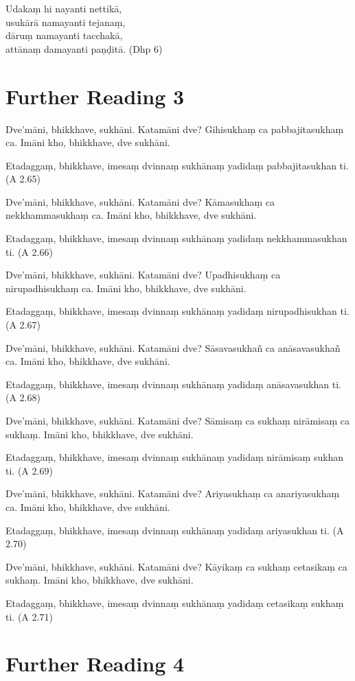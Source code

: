 Udakaṃ hi nayanti nettikā,\\
usukārā namayanti tejanaṃ,\\
dāruṃ namayanti tacchakā,\\
attānaṃ damayanti paṇḍitā. \hfill(Dhp 6)

\section*{Further Reading 3}

Dve’māni, bhikkhave, sukhāni. Katamāni dve? Gihisukhaṃ ca pabbajitasukhaṃ ca. Imāni kho, bhikkhave, dve sukhāni.

Etadaggaṃ, bhikkhave, imesaṃ dvinnaṃ sukhānaṃ yadidaṃ pabbajitasukhan ti. \hfill(A 2.65)

Dve’māni, bhikkhave, sukhāni. Katamāni dve? Kāmasukhaṃ ca nekkhammasukhaṃ ca. Imāni kho, bhikkhave, dve sukhāni.

Etadaggaṃ, bhikkhave, imesaṃ dvinnaṃ sukhānaṃ yadidaṃ nekkhammasukhan ti. \hfill(A 2.66)

Dve’māni, bhikkhave, sukhāni. Katamāni dve? Upadhisukhaṃ ca nirupadhisukhaṃ ca. Imāni kho, bhikkhave, dve sukhāni.

Etadaggaṃ, bhikkhave, imesaṃ dvinnaṃ sukhānaṃ yadidaṃ nirupadhisukhan ti. \hfill(A 2.67)

Dve’māni, bhikkhave, sukhāni. Katamāni dve? Sāsavasukhañ ca anāsavasukhañ ca. Imāni kho, bhikkhave, dve sukhāni.

Etadaggaṃ, bhikkhave, imesaṃ dvinnaṃ sukhānaṃ yadidaṃ anāsavasukhan ti. \hfill(A 2.68)

Dve’māni, bhikkhave, sukhāni. Katamāni dve? Sāmisaṃ ca sukhaṃ nirāmisaṃ ca sukhaṃ. Imāni kho, bhikkhave, dve sukhāni.

Etadaggaṃ, bhikkhave, imesaṃ dvinnaṃ sukhānaṃ yadidaṃ nirāmisaṃ sukhan ti. \hfill(A 2.69)

Dve’māni, bhikkhave, sukhāni. Katamāni dve? Ariyasukhaṃ ca anariyasukhaṃ ca. Imāni kho, bhikkhave, dve sukhāni.

Etadaggaṃ, bhikkhave, imesaṃ dvinnaṃ sukhānaṃ yadidaṃ ariyasukhan ti. \hfill(A 2.70)

Dve’māni, bhikkhave, sukhāni. Katamāni dve? Kāyikaṃ ca sukhaṃ cetasikaṃ ca sukhaṃ. Imāni kho, bhikkhave, dve sukhāni.

Etadaggaṃ, bhikkhave, imesaṃ dvinnaṃ sukhānaṃ yadidaṃ cetasikaṃ sukhaṃ ti. \hfill(A 2.71)

\section*{Further Reading 4}

